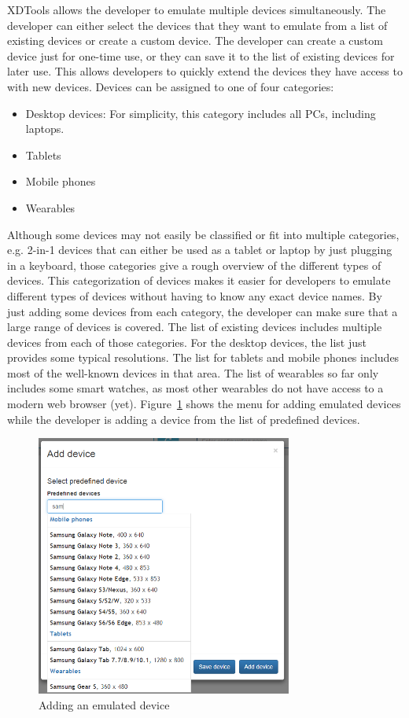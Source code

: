 XDTools allows the developer to emulate multiple devices simultaneously. The developer can either select the devices that they want to emulate from a list of existing devices or create a custom device. The developer can create a custom device just for one-time use, or they can save it to the list of existing devices for later use. This allows developers to quickly extend the devices they have access to with new devices. Devices can be assigned to one of four categories:
\begin{itemize}
	\item Desktop devices: For simplicity, this category includes all PCs, including laptops.
	\item Tablets
	\item Mobile phones
	\item Wearables
\end{itemize}
Although some devices may not easily be classified or fit into multiple categories, e.g. 2-in-1 devices that can either be used as a tablet or laptop by just plugging in a keyboard, those categories give a rough overview of the different types of devices. This categorization of devices makes it easier for developers to emulate different types of devices without having to know any exact device names. By just adding some devices from each category, the developer can make sure that a large range of devices is covered. The list of existing devices includes multiple devices from each of those categories. For the desktop devices, the list just provides some typical resolutions. The list for tablets and mobile phones includes most of the well-known devices in that area. The list of wearables so far only includes some smart watches, as most other wearables do not have access to a modern web browser (yet). Figure~\ref{fig:adding_emulated} shows the menu for adding emulated devices while the developer is adding a device from the list of predefined devices.

\begin{figure}[H]
  \centering
    \includegraphics[width=0.75\textwidth]{images/screenshots/adding_device_predefined.png}
	\caption[Screenshot: Adding emulated devices]{Adding an emulated device}
	\label{fig:adding_emulated}
\end{figure}

